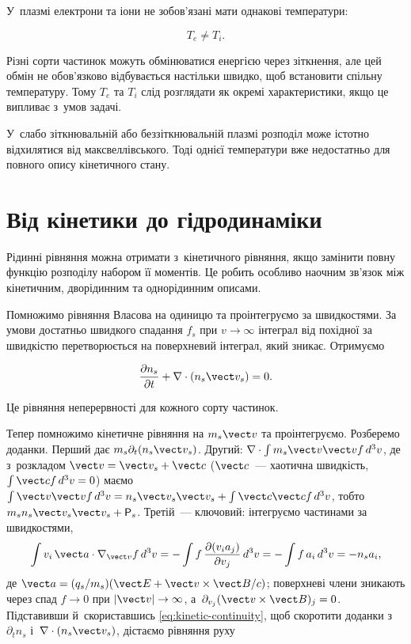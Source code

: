 У~плазмі електрони та іони не зобов'язані мати однакові температури:

\begin{equation*}
T_e\neq T_i.
\end{equation*}

Різні сорти частинок можуть обмінюватися енергією через зіткнення, але цей обмін не
обов'язково відбувається настільки швидко, щоб встановити спільну температуру. Тому $T_e$
та $T_i$ слід розглядати як окремі характеристики, якщо це випливає з~умов задачі.

У~слабо зіткнювальній або беззіткнювальній плазмі розподіл може істотно відхилятися від
максвеллівського. Тоді однієї температури вже недостатньо для повного опису кінетичного
стану.

\section{Від кінетики до гідродинаміки}\label{sec:kinetic-moments}

Рідинні рівняння можна отримати з~кінетичного рівняння, якщо замінити повну функцію
розподілу набором її моментів. Це робить особливо наочним зв'язок між кінетичним,
дворідинним та однорідинним описами.

Помножимо рівняння Власова на одиницю та проінтегруємо за швидкостями. За умови достатньо
швидкого спадання $f_s$ при $v\to\infty$ інтеграл від похідної за швидкістю перетворюється
на поверхневий інтеграл, який зникає. Отримуємо

\begin{equation}\label{eq:kinetic-continuity}
\frac{\partial n_s}{\partial t}
+\nabla\cdot(n_s\vect v_s)=0.
\end{equation}

Це рівняння неперервності для кожного сорту частинок.

Тепер помножимо кінетичне рівняння на $m_s\vect v$ та проінтегруємо. Розберемо доданки.
Перший дає $m_s\partial_t(n_s\vect v_s)$. Другий: $\nabla\cdot\int m_s\vect v\vect vf\,d^3v$, де з~розкладом
$\vect v=\vect v_s+\vect c$ ($\vect c$~--- хаотична швидкість, $\int\vect cf\,d^3v=0$) маємо
$\int\vect v\vect vf\,d^3v=n_s\vect v_s\vect v_s+\int\vect c\vect cf\,d^3v$, тобто $m_sn_s\vect v_s\vect v_s+\mathsf P_s$.
Третій~--- ключовий: інтегруємо частинами за швидкостями,
\[\int v_i\,\vect a\cdot\nabla_{\vect v}f\,d^3v=-\int f\,\frac{\partial(v_ia_j)}{\partial v_j}\,d^3v=-\int f\,a_i\,d^3v=-n_sa_i,\]
де $\vect a=(q_s/m_s)(\vect E+\vect v\times\vect B/c)$; поверхневі члени зникають через спад $f\to0$ при $|\vect v|\to\infty$,
а~$\partial_{v_j}(\vect v\times\vect B)_j=0$. Підставивши й~скориставшись
\eqref{eq:kinetic-continuity}, щоб скоротити доданки з~$\partial_tn_s$ і~$\nabla\cdot(n_s\vect v_s)$, дістаємо
рівняння руху

